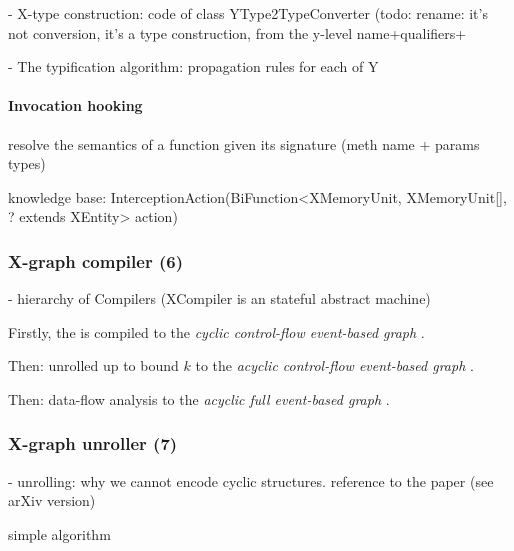 
- X-type construction: code of class YType2TypeConverter (todo: rename: it's not conversion, it's a type construction, from the y-level name+qualifiers+

- The typification algorithm: propagation rules for each of Y


\paragraph{Invocation hooking}
\label{ch:impl:proc:x-pre-compiler:hooks}

resolve the semantics of a function given its signature (meth name + params types)

knowledge base: InterceptionAction(BiFunction<XMemoryUnit, XMemoryUnit[], ? extends XEntity> action)


\subsubsection{X-graph compiler (6)}
\label{ch:impl:proc:x-compiler}

- hierarchy of Compilers (XCompiler is an stateful abstract machine)

Firstly, the \ytree{} is compiled to the \textit{cyclic control-flow event-based graph} \xgraph[CF].

Then: unrolled up to bound $k$ to the \textit{acyclic control-flow event-based graph} \xgraphU[CF].

Then: data-flow analysis to the \textit{acyclic full event-based graph} \xgraphU[CF+DF].



\subsubsection{X-graph unroller (7)}
\label{ch:impl:proc:x-unroll}

- unrolling: why we cannot encode cyclic structures. reference to the paper (see arXiv version)

simple algorithm

